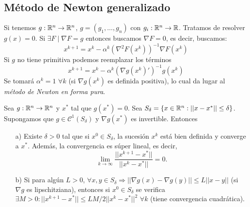 \documentclass[MIOP.tex]{subfiles}
\begin{document}
\subsection{Método de Newton generalizado}
Si tenemos $g:\mathbb{R}^{n}\to \mathbb{R}^n$, $g=(g_1,\dotsc,g_n)$ con $g_i : \mathbb{R}^n \to \mathbb{R}$. Tratamos de resolver $g(x)=0$. Si $\exists F\mid \nabla F = g$ entonces buscamos $\nabla F =0$, es decir, buscamos:
\[
x^{k+1} =x^k - \alpha^k (\nabla^2 F(x^k))^{-1}\nabla F(x^k)
\]
Si $g$ no tiene primitiva podemos reemplazar los términos 
\[
x^{k+1}=x^k-\alpha^k(\nabla g(x^k)')^{-1} g(x^k)
\]
Se tomará $\alpha^k =1$ $\forall k$ (si $\nabla g(x^k)$ es definida positiva), lo cual da lugar al \emph{método de Newton en forma pura}.

\begin{teorema}
Sea $g:\mathbb{R}^n\to\mathbb{R}^n$ y $x^*$ tal que $g(x^*)=0$. Sea $S_\delta=\{x\in\mathbb{R}^n:||x-x^*||\leq\delta\}$. Supongamos que $g\in\mathcal{C}^1(S_\delta)$ y $\nabla g(x^*)$ es invertible. Entonces
\begin{itemize}
\item[a)] Existe $\delta>0$ tal que si $x^0\in S_\delta$, la sucesión $x^k$ está bien definida y converge a $x^*$. Además, la convergencia es súper lineal, es decir,
$$\lim_{k\to\infty}\frac{||x^{k+1}-x^*||}{||x^k-x^*||}=0.$$
\item[b)] Si para algún $L>0$, $\forall x,y\in S_\delta\Rightarrow ||\nabla g(x)-\nabla g(y)||\leq L||x-y||$ (si $\nabla g$ es lipschitziana), entonces si $x^0\in S_\delta$ se verifica $\exists M>0:||x^{k+1}-x^*||\leq LM/2||x^k-x^*||^2$ $\forall k$ (tiene convergencia cuadrática).
\end{itemize}
\end{teorema}
\end{document}

